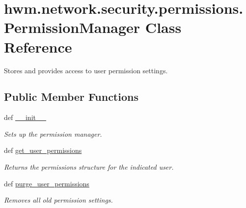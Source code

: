 \hypertarget{classhwm_1_1network_1_1security_1_1permissions_1_1_permission_manager}{\section{hwm.\-network.\-security.\-permissions.\-Permission\-Manager Class Reference}
\label{classhwm_1_1network_1_1security_1_1permissions_1_1_permission_manager}
}


Stores and provides access to user permission settings.  


\subsection*{Public Member Functions}
\begin{DoxyCompactItemize}
\item 
def \hyperlink{classhwm_1_1network_1_1security_1_1permissions_1_1_permission_manager_afec88b3af9dd60f747301326a74bcc41}{\-\_\-\-\_\-init\-\_\-\-\_\-}
\begin{DoxyCompactList}\small\item\em Sets up the permission manager. \end{DoxyCompactList}\item 
def \hyperlink{classhwm_1_1network_1_1security_1_1permissions_1_1_permission_manager_a5421104d64c12e1a91840ea0597b4b3a}{get\-\_\-user\-\_\-permissions}
\begin{DoxyCompactList}\small\item\em Returns the permissions structure for the indicated user. \end{DoxyCompactList}\item 
def \hyperlink{classhwm_1_1network_1_1security_1_1permissions_1_1_permission_manager_a39ec9fc3abdaffa9df1fc77ce62272d2}{purge\-\_\-user\-\_\-permissions}
\begin{DoxyCompactList}\small\item\em Removes all old permission settings. \end{DoxyCompactList}\end{DoxyCompactItemize}
